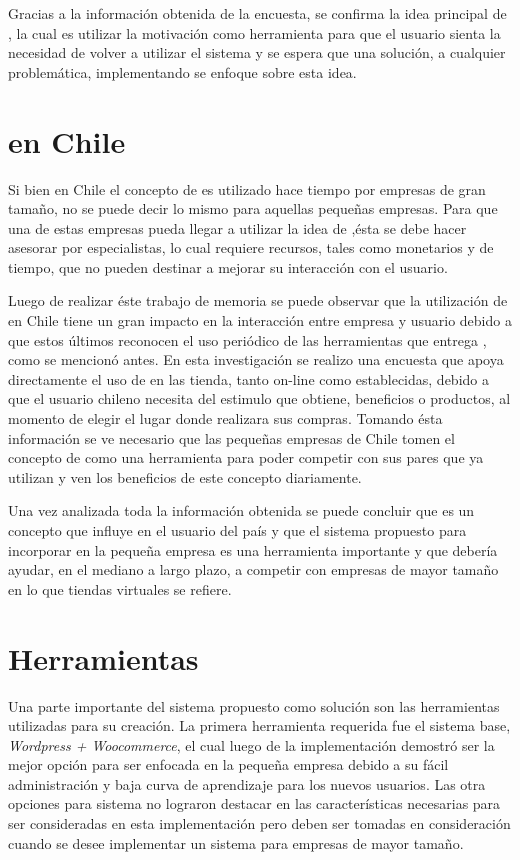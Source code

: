 Gracias a la información obtenida de la encuesta, se confirma la
idea principal de {\gam}, la cual es utilizar la motivación como herramienta para
que el usuario sienta la necesidad de volver a utilizar el sistema y
se espera que una solución, a cualquier problemática, implementando {\gam} se
enfoque sobre esta idea.

\section{{\GAM} en Chile}

Si bien en Chile el concepto de {\gam} es utilizado hace tiempo por empresas de gran tamaño, no se
puede decir lo mismo para aquellas pequeñas empresas. Para que una de estas empresas pueda
llegar a utilizar la idea de {\gam},ésta se debe hacer asesorar por especialistas, lo cual
requiere recursos, tales como monetarios y de tiempo, que no pueden destinar a mejorar su interacción con el usuario.

Luego de realizar éste trabajo de memoria se puede observar que la utilización de {\gam} en Chile tiene
un gran impacto en la interacción entre empresa y usuario debido a que estos últimos reconocen el uso
periódico de las herramientas que entrega {\gam}, como se mencionó antes.
En esta investigación se realizo una encuesta que apoya directamente el uso de {\gam} en las tienda, tanto
on-line como establecidas, debido a que el usuario chileno necesita del estimulo que obtiene, beneficios o productos,
al momento de elegir el lugar donde realizara sus compras. Tomando ésta información se ve necesario que las
pequeñas empresas de Chile tomen el concepto de {\gam} como una herramienta para poder competir con sus
pares que ya utilizan {\gam} y ven los beneficios de este concepto diariamente.

Una vez analizada toda la información obtenida se puede concluir que {\gam} es un concepto que influye
en el usuario del país y que el sistema propuesto para incorporar {\gam} en la pequeña empresa
es una herramienta importante y que debería ayudar, en el mediano a largo plazo, a competir con empresas
de mayor tamaño en lo que tiendas virtuales se refiere.

\section{Herramientas}

Una parte importante del sistema propuesto como solución son las herramientas utilizadas para su creación.
La primera herramienta requerida fue el sistema base, \emph{Wordpress + Woocommerce}, el cual luego de
la implementación demostró ser la mejor opción para ser enfocada en la pequeña empresa debido a su
fácil administración y baja curva de aprendizaje para los nuevos usuarios. Las otra opciones para sistema no lograron
destacar en las características necesarias para ser consideradas en esta implementación pero deben ser
tomadas en consideración cuando se desee implementar un sistema para empresas de mayor tamaño.


